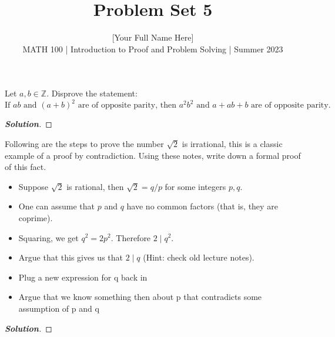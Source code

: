 \documentclass[11pt]{article}
\newenvironment{problem}[2][Problem\!]{\begin{trivlist}
\item[\hskip \labelsep {\bfseries #1}\hskip \labelsep {\bfseries #2.}]}{\end{trivlist}}
\newenvironment{solution}{\begin{proof}[\textbf{\textit{Solution}}]}{\end{proof}}
\newcommand{\zz}{\mathbb Z}   %
\begin{document}
 
\title{Problem Set 5}
\author{[Your Full Name Here]\\[0.5em]
MATH 100 | Introduction to Proof and Problem Solving | Summer 2023}
\date{} 
\maketitle


\begin{problem}{5.1}
Let $a, b \in \zz$. Disprove the statement: \[\text{If $ab$ and $(a + b)^2$ are of opposite parity, then $a^2b^2$ and $a + ab + b$ are of opposite parity.}\]
\end{problem}
\begin{solution}\hfill %
\end{solution}

\newpage %

\begin{problem}{5.2}Following are the steps to prove the number $\sqrt{2}$ is irrational, this is a classic example of a proof by contradiction. Using these notes, write down a formal proof of this fact.
\begin{itemize}
\item Suppose $\sqrt{2}$ is rational, then $\sqrt{2} = q/p$ for some integers $p,q$. 
\item One can assume that $p$ and $q$ have no common factors (that is, they are coprime).
\item Squaring, we get $q^2 = 2p^2$. Therefore $2\mid q^2$.
\item Argue that this gives us that $2\mid q$ (Hint: check old lecture notes).
\item Plug a new expression for q back in
\item Argue that we know something then about p that contradicts some assumption of p and q
\end{itemize}
\end{problem}
\begin{solution}\hfill %
\end{solution}

\newpage  %
\end{document}
